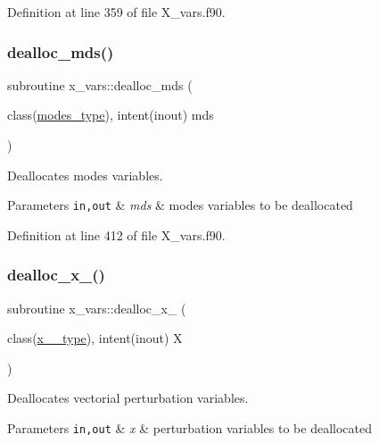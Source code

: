 Definition at line 359 of file X\+\_\+vars.\+f90.

\mbox{\label{namespacex__vars_a4a7e4b95bbcb90e8afb4985fc9456e67}} 
\subsubsection{\texorpdfstring{dealloc\+\_\+mds()}{dealloc\_mds()}}
{\footnotesize\ttfamily subroutine x\+\_\+vars\+::dealloc\+\_\+mds (\begin{DoxyParamCaption}\item[{class(\hyperlink{structx__vars_1_1modes__type}{modes\+\_\+type}), intent(inout)}]{mds }\end{DoxyParamCaption})}



Deallocates modes variables. 


\begin{DoxyParams}[1]{Parameters}
\mbox{\tt in,out}  & {\em mds} & modes variables to be deallocated \\
\hline
\end{DoxyParams}


Definition at line 412 of file X\+\_\+vars.\+f90.

\mbox{\label{namespacex__vars_a20679fb70a3dbfcdf2479b1219b847d1}} 
\subsubsection{\texorpdfstring{dealloc\+\_\+x\+\_()}{dealloc\_x\_1()}}
{\footnotesize\ttfamily subroutine x\+\_\+vars\+::dealloc\+\_\+x\+\_ (\begin{DoxyParamCaption}\item[{class(\hyperlink{structx__vars_1_1x__1__type}{x\+\_\+1\+\_\+type}), intent(inout)}]{X }\end{DoxyParamCaption})}



Deallocates vectorial perturbation variables. 


\begin{DoxyParams}[1]{Parameters}
\mbox{\tt in,out}  & {\em x} & perturbation variables to be deallocated \\
\hline
\end{DoxyParams}


